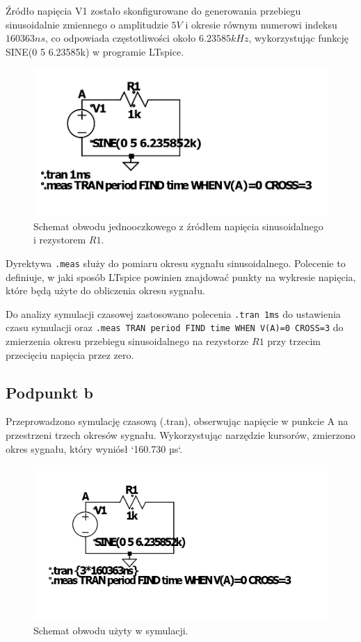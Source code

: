 \documentclass[10pt]{article}
\begin{document}
	Źródło napięcia V1 zostało skonfigurowane do generowania przebiegu sinusoidalnie zmiennego o amplitudzie \(5V\) i okresie równym numerowi indeksu \(160363ns\), co odpowiada częstotliwości około \(6.23585 kHz\), wykorzystując funkcję SINE(0 5 6.23585k) w programie LTspice.
	
	\begin{figure}[H]
		\centering
		\includegraphics[width=\linewidth]{2aobwod}
		\caption{Schemat obwodu jednooczkowego z źródłem napięcia sinusoidalnego i rezystorem \( R1 \).}
		\label{fig:2aobwod}
	\end{figure}
	
	Dyrektywa \texttt{.meas} służy do pomiaru okresu sygnału sinusoidalnego. Polecenie to definiuje, w jaki sposób LTspice powinien znajdować punkty na wykresie napięcia, które będą użyte do obliczenia okresu sygnału. 
	
	Do analizy symulacji czasowej zastosowano polecenia \texttt{.tran 1ms} do ustawienia czasu symulacji oraz \texttt{.meas TRAN period FIND time WHEN V(A)=0 CROSS=3} do zmierzenia okresu przebiegu sinusoidalnego na rezystorze \(R1\) przy trzecim przecięciu napięcia przez zero.
	
	\pagebreak
	\subsection*{Podpunkt b}
	Przeprowadzono symulację czasową (.tran), obserwując napięcie w punkcie A na przestrzeni trzech okresów sygnału. Wykorzystując narzędzie kursorów, zmierzono okres sygnału, który wyniósł `160.730 µs`.
	
	\begin{figure}[H]
		\centering
		\includegraphics[width=\linewidth]{2bobwod}
		\caption{Schemat obwodu użyty w symulacji.}
		\label{fig:2bobwod}
	\end{figure}
	
\end{document}
